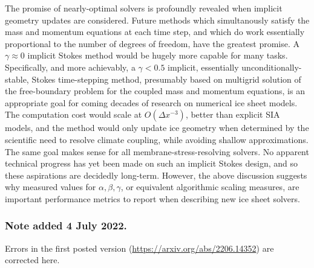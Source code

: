 \documentclass[review,letterpaper]{igs}
\begin{document}
The promise of nearly-optimal solvers is profoundly revealed when implicit geometry updates are considered.  Future methods which simultanously satisfy the mass and momentum equations at each time step, and which do work essentially proportional to the number of degrees of freedom, have the greatest promise.  A $\gamma \approx 0$ implicit Stokes method would be hugely more capable for many tasks.  Specifically, and more achievably, a $\gamma < 0.5$ implicit, essentially unconditionally-stable, Stokes time-stepping method, presumably based on multigrid solution of the free-boundary problem for the coupled mass and momentum equations, is an appropriate goal for coming decades of research on numerical ice sheet models.  The computation cost would scale at $O(\Delta x^{-3})$, better than explicit SIA models, and the method would only update ice geometry when determined by the scientific need to resolve climate coupling, while avoiding shallow approximations.  The same goal makes sense for all membrane-stress-resolving solvers.  No apparent technical progress has yet been made on such an implicit Stokes design, and so these aspirations are decidedly long-term.  However, the above discussion suggests why measured values for $\alpha,\beta,\gamma$, or equivalent algorithmic scaling measures, are important performance metrics to report when describing new ice sheet solvers.

\subsubsection{Note added 4 July 2022.}  Errors in the first posted version (\url{https://arxiv.org/abs/2206.14352}) are corrected here.



\end{document}
